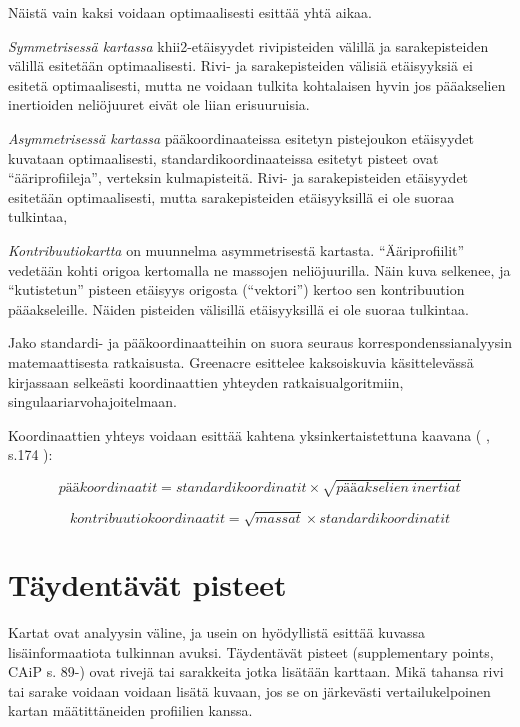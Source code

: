\documentclass[
  finnish,
]{book}
\begin{document}
Näistä vain kaksi voidaan optimaalisesti esittää yhtä aikaa.

\emph{Symmetrisessä kartassa} khii2-etäisyydet rivipisteiden välillä ja sarakepisteiden
välillä esitetään optimaalisesti. Rivi- ja sarakepisteiden välisiä etäisyyksiä ei
esitetä optimaalisesti, mutta ne voidaan tulkita kohtalaisen hyvin jos pääakselien
inertioiden neliöjuuret eivät ole liian erisuuruisia.

\emph{Asymmetrisessä kartassa} pääkoordinaateissa esitetyn pistejoukon etäisyydet
kuvataan optimaalisesti, standardikoordinaateissa esitetyt pisteet ovat ``ääriprofiileja'',
verteksin kulmapisteitä. Rivi- ja sarakepisteiden etäisyydet esitetään optimaalisesti,
mutta sarakepisteiden etäisyyksillä ei ole suoraa tulkintaa,

\emph{Kontribuutiokartta} on muunnelma asymmetrisestä kartasta. ``Ääriprofiilit'' vedetään
kohti origoa kertomalla ne massojen neliöjuurilla. Näin kuva selkenee, ja ``kutistetun''
pisteen etäisyys origosta (``vektori'') kertoo sen kontribuution pääakseleille. Näiden pisteiden
välisillä etäisyyksillä ei ole suoraa tulkintaa.

Jako standardi- ja pääkoordinaatteihin on suora seuraus korrespondenssianalyysin
matemaattisesta ratkaisusta. Greenacre esittelee kaksoiskuvia käsittelevässä
kirjassaan \citep{RefWorks:doc:5a857a43e4b0ed2d44664d7c} selkeästi koordinaattien
yhteyden ratkaisualgoritmiin, singulaariarvohajoitelmaan.

Koordinaattien yhteys voidaan esittää kahtena yksinkertaistettuna kaavana
( \citet{RefWorks:doc:5b8175eee4b08da192f99a35}, s.174 ):

\begin{equation}
  pääkoordinaatit = standardikoordinatit \times \sqrt{pääakselien \: inertiat}
    \label{eq:pcfromstd1}
\end{equation}

\begin{equation}
  kontribuutiokoordinaatit = \sqrt{massat} \times  standardikoordinatit 
    \label{eq:kontribfromstd1}
\end{equation}

\hypertarget{tuxe4ydentuxe4vuxe4t-pisteet}{%
\chapter{Täydentävät pisteet}\label{tuxe4ydentuxe4vuxe4t-pisteet}}

Kartat ovat analyysin väline, ja usein on hyödyllistä esittää kuvassa
lisäinformaatiota tulkinnan avuksi. Täydentävät pisteet (supplementary points,
CAiP s. 89-) ovat rivejä tai sarakkeita jotka lisätään karttaan. Mikä tahansa
rivi tai sarake voidaan voidaan lisätä kuvaan, jos se on järkevästi vertailukelpoinen
kartan määtittäneiden profiilien kanssa.
\end{document}
